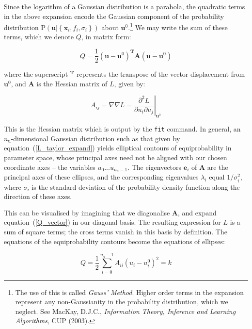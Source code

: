 \documentclass[a4paper,onecolumn,11pt]{book}
\begin{document}
Since the logarithm of a Gaussian distribution is a parabola, the quadratic
terms in the above expansion encode the Gaussian component of the probability
distribution $\mathrm{P}\left( \mathbf{u} | \left\{ \mathbf{x}_i, f_i, \sigma_i
\right\} \right)$ about $\mathbf{u}^0$.\footnote{The use of this is called
\textit{Gauss' Method}. Higher order terms in the expansion represent any
non-Gaussianity in the probability distribution, which we neglect. See MacKay,
D.J.C., \textit{Information Theory, Inference and Learning Algorithms}, CUP
(2003).} We may write the sum of these terms, which we denote $Q$, in matrix
form:

\begin{equation}
Q = \frac{1}{2} \left(\mathbf{u} - \mathbf{u}^0\right)^\mathbf{T} \mathbf{A} \left(\mathbf{u} - \mathbf{u}^0\right)
\label{Q_vector}
\end{equation}

\noindent where the superscript $^\mathbf{T}$ represents the transpose of the
vector displacement from $\mathbf{u}^0$, and $\mathbf{A}$ is the Hessian matrix
of $L$, given by:

\begin{equation}
A_{ij} = \nabla\nabla L = \left.\frac{\partial^2 L}{\partial u_i \partial u_j}\right|_{\mathbf{u}^0}
\end{equation}

This is the Hessian matrix which is output by the \texttt{fit} command. In
general, an $n_\mathrm{u}$-dimensional Gaussian distribution such as that given
by equation~(\ref{L_taylor_expand}) yields elliptical contours of
equiprobability in parameter space, whose principal axes need not be aligned
with our chosen coordinate axes -- the variables $u_0 ... u_{n_u-1}$. The
eigenvectors $\mathbf{e}_i$ of $\mathbf{A}$ are the principal axes of these
ellipses, and the corresponding eigenvalues $\lambda_i$ equal $1/\sigma_i^2$,
where $\sigma_i$ is the standard deviation of the probability density function
along the direction of these axes.

This can be visualised by imagining that we diagonalise $\mathbf{A}$, and
expand equation~(\ref{Q_vector}) in our diagonal basis. The resulting
expression for $L$ is a sum of square terms; the cross terms vanish in this
basis by definition. The equations of the equiprobability contours become the
equations of ellipses:

\begin{equation}
Q = \frac{1}{2} \sum_{i=0}^{n_\mathrm{u}-1} A_{ii} \left(u_i - u^0_i\right)^2 = k
\end{equation}
\end{document}

